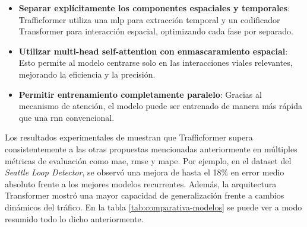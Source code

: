 \begin{itemize}
	\item \textbf{Separar explícitamente los componentes espaciales y temporales}: Trafficformer utiliza una \acrshort{mlp} para extracción temporal y un codificador Transformer para interacción espacial, optimizando cada fase por separado.
	\item \textbf{Utilizar multi-head self-attention con enmascaramiento espacial}: Esto permite al modelo centrarse solo en las interacciones viales relevantes, mejorando la eficiencia y la precisión.
	\item \textbf{Permitir entrenamiento completamente paralelo}: Gracias al mecanismo de atención, el modelo puede ser entrenado de manera más rápida que una \acrshort{rnn} convencional.
\end{itemize}

Los resultados experimentales de \cite{trafficformer} muestran que Trafficformer supera consistentemente a las otras propuestas mencionadas anteriormente en múltiples métricas de evaluación como \acrshort{mae}, \acrshort{rmse} y \acrshort{mape}. Por ejemplo, en el dataset del \textit{Seattle Loop Detector}, se observó una mejora de hasta el 18\% en error medio absoluto frente a los mejores modelos recurrentes. Además, la arquitectura Transformer mostró una mayor capacidad de generalización frente a cambios dinámicos del tráfico. En la tabla \ref{tab:comparativa-modelos} se puede ver a modo resumido todo lo dicho anteriormente.

